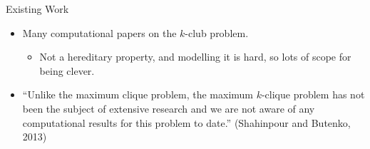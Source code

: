 \documentclass{beamer}
\begin{document}
\begin{frame}{Existing Work}
    \begin{itemize}
        \item Many computational papers on the $k$-club problem.
            \begin{itemize}
                \item Not a hereditary property, and modelling it is hard, so lots of scope for
                    being clever.
            \end{itemize}

        \item ``Unlike the maximum clique problem, the maximum $k$-clique problem has not been the
            subject of extensive research and we are not aware of any computational results for this
            problem to date.'' (Shahinpour and Butenko, 2013)
    \end{itemize}
\end{frame}
\end{document}
